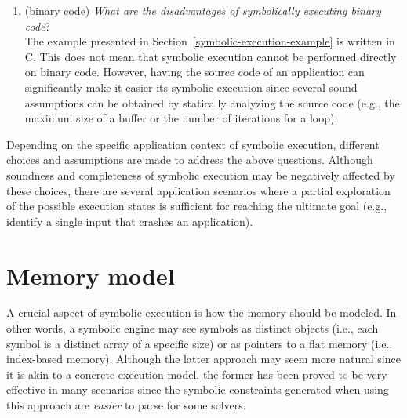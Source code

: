 \begin{enumerate}
  \item (binary code) {\em What are the disadvantages of symbolically executing binary code}? \\
  The example presented in Section~\ref{symbolic-execution-example} is written in C. This does not mean that symbolic execution cannot be performed directly on binary code. However, having the source code of an application can significantly make it easier its symbolic execution since several sound assumptions can be obtained by statically analyzing the source code (e.g., the maximum size of a buffer or the number of iterations for a loop).
   
\end{enumerate}
Depending on the specific application context of symbolic execution, different choices and assumptions are made to address the above questions. Although soundness and completeness of symbolic execution may be negatively affected by these choices, there are several application scenarios where a partial exploration of the possible execution states is sufficient for reaching the ultimate goal (e.g., identify a single input that crashes an application).


\section{Memory model}
\label{memory-model}

A crucial aspect of symbolic execution is how the memory should be modeled. In other words, a symbolic engine may see symbols as distinct objects (i.e., each symbol is a distinct array of a specific size) or as pointers to a flat memory (i.e., index-based memory). Although the latter approach may seem more natural since it is akin to a concrete execution model, the former has been proved to be very effective in many scenarios since the symbolic constraints generated when using this approach are {\em easier} to parse for some solvers.

